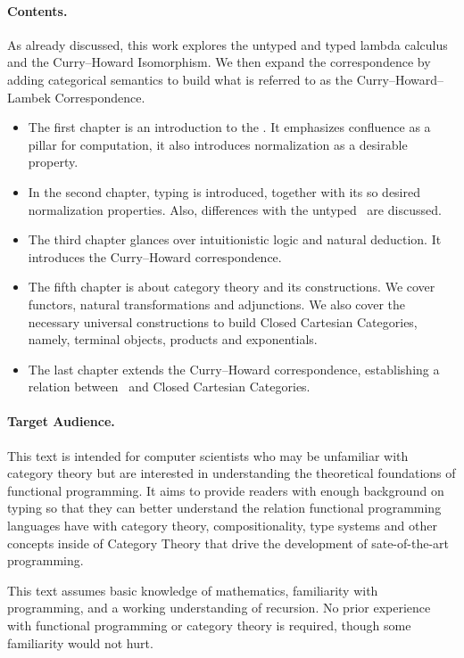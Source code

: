 \paragraph{Contents.}
{
As already discussed, this work explores the untyped and typed lambda calculus and the Curry--Howard Isomorphism. We then expand the correspondence by adding categorical semantics to build what is referred to as the Curry--Howard--Lambek Correspondence.
}

\begin{itemize}
\item The first chapter is an introduction to the \lcalc. It emphasizes confluence as a pillar for computation, it also introduces normalization as a desirable property.

\item In the second chapter, typing is introduced, together with its so desired normalization properties. Also, differences with the untyped \lcalc \ are discussed.

\item The third chapter glances over intuitionistic logic and natural deduction. It introduces the Curry--Howard correspondence.

\item The fifth chapter is about category theory and its constructions. We cover functors, natural transformations and adjunctions. We also cover the necessary universal constructions to build Closed Cartesian Categories, namely, terminal objects, products and exponentials.

\item The last chapter extends the Curry--Howard correspondence, establishing a relation between \lcalc \ and Closed Cartesian Categories.
\end{itemize}


\paragraph{Target Audience.}{
This text is intended for computer scientists who may be unfamiliar with category theory but are interested in understanding the theoretical foundations of functional programming. It aims to provide readers with enough background on typing so that they can better understand the relation functional programming languages have with category theory, compositionality, type systems and other concepts inside of Category Theory that drive the development of sate-of-the-art programming.

This text assumes basic knowledge of mathematics, familiarity with programming, and a working understanding of recursion. No prior experience with functional programming or category theory is required, though some familiarity would not hurt.
}

